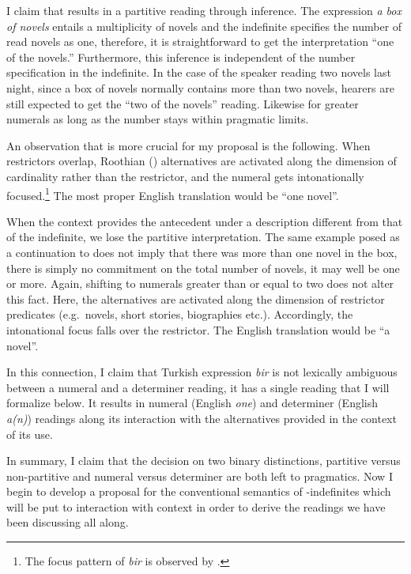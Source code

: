 \documentclass[11pt,a4paper]{article}
\begin{document}
I claim that  results in a partitive reading through
inference. The expression \emph{a box of novels} entails a
multiplicity of novels and the indefinite specifies the number of read
novels as one, therefore, it is straightforward to get the
interpretation ``one of the novels.'' Furthermore, this inference is
independent of the number specification in the indefinite. In the case
of the speaker reading two novels last night, since a box of novels
normally contains more than two novels, hearers are still expected to
get the ``two of the novels'' reading. Likewise for greater numerals
as long as the number stays within pragmatic limits.

An observation that is more crucial for my proposal is the following.
When restrictors overlap, Roothian (\citeyear{rooth92}) alternatives
are activated along the dimension of cardinality rather than the
restrictor, and the numeral gets intonationally focused.\footnote{The
focus pattern of \emph{bir} is observed by .} The
most proper English translation would be ``one novel''.

When the context provides the antecedent under a description different
from that of the indefinite, we lose the partitive interpretation.
The same example  posed as a continuation to
 does not imply that there was more than one novel
in the box, there is simply no commitment on the total number of
novels, it may well be one or more. Again, shifting to numerals
greater than or equal to two does not alter this fact. Here, the
alternatives are activated along the dimension of restrictor
predicates (e.g.\ novels, short stories, biographies etc.).
Accordingly, the intonational focus falls over the restrictor. The
English translation would be ``a novel''.

In this connection, I claim that Turkish expression \emph{bir} is not
lexically ambiguous between a numeral and a determiner reading, it has
a single reading that I will formalize below. It results in numeral
(English \emph{one}) and determiner (English \emph{a(n)}) readings
along its interaction with the alternatives provided in the context of
its use.

In summary, I claim that the decision on two binary distinctions,
partitive versus non-partitive and numeral versus determiner are both
left to pragmatics. Now I begin to develop a proposal for the
conventional semantics of \acc-indefinites which will be put to
interaction with context in order to derive the readings we have been
discussing all along.
\end{document}
